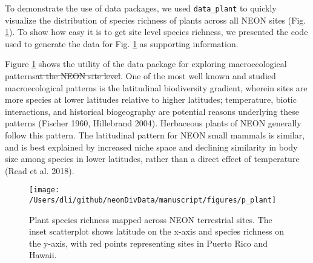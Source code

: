 \documentclass[
  12pt,
]{article}
\providecommand{\DIFaddtex}[1]{{\protect\color{blue}\uwave{#1}}} %
\providecommand{\DIFdeltex}[1]{{\protect\color{red}\sout{#1}}}                      %
\providecommand{\DIFaddbegin}{} %
\providecommand{\DIFaddend}{} %
\providecommand{\DIFdelbegin}{} %
\providecommand{\DIFdelend}{} %
\providecommand{\DIFaddbeginFL}{} %
\providecommand{\DIFaddendFL}{} %
\providecommand{\DIFdelbeginFL}{} %
\providecommand{\DIFdelendFL}{} %
\providecommand{\DIFadd}[1]{\texorpdfstring{\DIFaddtex{#1}}{#1}} %
\providecommand{\DIFdel}[1]{\texorpdfstring{\DIFdeltex{#1}}{}} %
\newcommand{\DIFscaledelfig}{0.5}
\newlength{\DIFdelgraphicswidth} %
\newlength{\DIFdelgraphicsheight} %
\newcommand{\DIFaddincludegraphics}[2][]{{\color{blue}\fbox{\DIFOincludegraphics[#1]{#2}}}} %
\newcommand{\DIFdelincludegraphics}[2][]{%
\sbox{\DIFdelgraphicsbox}{\DIFOincludegraphics[#1]{#2}}%
\settoboxwidth{\DIFdelgraphicswidth}{\DIFdelgraphicsbox} %
\settoboxtotalheight{\DIFdelgraphicsheight}{\DIFdelgraphicsbox} %
\scalebox{\DIFscaledelfig}{%
\parbox[b]{\DIFdelgraphicswidth}{\usebox{\DIFdelgraphicsbox}\\[-\baselineskip] \rule{\DIFdelgraphicswidth}{0em}}\llap{\resizebox{\DIFdelgraphicswidth}{\DIFdelgraphicsheight}{%
\setlength{\unitlength}{\DIFdelgraphicswidth}%
\begin{picture}(1,1)%
\thicklines\linethickness{2pt} %
{\color[rgb]{1,0,0}\put(0,0){\framebox(1,1){}}}%
{\color[rgb]{1,0,0}\put(0,0){\line( 1,1){1}}}%
{\color[rgb]{1,0,0}\put(0,1){\line(1,-1){1}}}%
\end{picture}%
}\hspace*{3pt}}} %
} %
\DeclareRobustCommand{\DIFaddbegin}{\DIFOaddbegin \let\includegraphics\DIFaddincludegraphics} %
\DeclareRobustCommand{\DIFaddend}{\DIFOaddend \let\includegraphics\DIFOincludegraphics} %
\DeclareRobustCommand{\DIFdelbegin}{\DIFOdelbegin \let\includegraphics\DIFdelincludegraphics} %
\DeclareRobustCommand{\DIFdelend}{\DIFOaddend \let\includegraphics\DIFOincludegraphics} %
\DeclareRobustCommand{\DIFaddbeginFL}{\DIFOaddbeginFL \let\includegraphics\DIFaddincludegraphics} %
\DeclareRobustCommand{\DIFaddendFL}{\DIFOaddendFL \let\includegraphics\DIFOincludegraphics} %
\DeclareRobustCommand{\DIFdelbeginFL}{\DIFOdelbeginFL \let\includegraphics\DIFdelincludegraphics} %
\DeclareRobustCommand{\DIFdelendFL}{\DIFOaddendFL \let\includegraphics\DIFOincludegraphics} %
\begin{document}
To demonstrate the use of data packages, we used \texttt{data\_plant} to quickly visualize the distribution of species richness of plants across all NEON sites (Fig. \ref{fig:Fig2Map}). To show how easy it is to get site level species richness, we presented the code used to generate the data for Fig. \ref{fig:Fig2Map} as supporting information.

Figure \ref{fig:Fig2Map} shows the utility of the data package for exploring macroecological patterns\DIFdelbegin \DIFdel{at the NEON site level}\DIFdelend . One of the most well known and studied macroecological patterns is the latitudinal biodiversity gradient, wherein sites are more species \DIFaddbegin \DIFadd{rich }\DIFaddend at lower latitudes relative to higher latitudes; temperature, biotic interactions, and historical biogeography are potential reasons underlying these patterns (Fischer 1960, Hillebrand 2004). Herbaceous plants of NEON generally follow this pattern. The latitudinal pattern for NEON small mammals is similar, and is best explained by increased niche space and declining similarity in body size among species in lower latitudes, rather than a direct effect of temperature (Read et al. 2018).



\begin{figure}

{\centering \DIFdelbeginFL %
\DIFdelendFL \DIFaddbeginFL \texttt{[image: /Users/dli/github/neonDivData/manuscript/figures/p\_plant]} 
\DIFaddendFL 

}

\caption{Plant species richness mapped across NEON terrestrial sites. The inset scatterplot shows latitude on the x-axis and species richness on the y-axis, with red points representing sites in Puerto Rico and Hawaii.}\label{fig:Fig2Map}
\end{figure}
\end{document}
